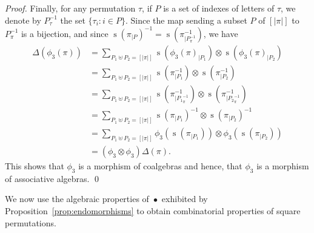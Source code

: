 \documentclass[a4paper,10pt]{llncs}
\DeclareMathOperator{\STD}{\mathrm{s}}
\DeclareMathOperator{\SHUFFLE}{\bullet}
\begin{document}
\begin{proof}
    Finally, for any permutation $\tau$, if $P$ is a set of indexes of
    letters of $\tau$, we denote by $P_\tau^{-1}$ the set
    $\{\tau_i : i \in P\}$. Since the map sending a subset $P$ of
    $[|\pi|]$ to $P_\pi^{-1}$ is a bijection, and since
    $\STD\left(\pi_{|P}\right)^{-1} = \STD\left(\pi^{-1}_{|P_\pi^{-1}}\right)$,
    we have
    \begin{equation} \begin{split}
        \Delta(\phi_3(\pi))
        & = \sum_{P_1 \uplus P_2 = [|\pi|]}
        \STD\left(\phi_3(\pi)_{|P_1}\right)
        \otimes \STD\left(\phi_3(\pi)_{|P_2}\right) \\
        & = \sum_{P_1 \uplus P_2 = [|\pi|]}
        \STD\left(\pi^{-1}_{|P_1}\right)
        \otimes \STD\left(\pi^{-1}_{|P_2}\right) \\
        & = \sum_{P_1 \uplus P_2 = [|\pi|]}
        \STD\left(\pi^{-1}_{|{P_1}_\pi^{-1}}\right)
        \otimes \STD\left(\pi^{-1}_{|{P_2}_\pi^{-1}}\right) \\
        & = \sum_{P_1 \uplus P_2 = [|\pi|]}
        \STD\left(\pi_{|P_1}\right)^{-1}
        \otimes \STD\left(\pi_{|P_2}\right)^{-1} \\
        & = \sum_{P_1 \uplus P_2 = [|\pi|]}
        \phi_3\left(\STD\left(\pi_{|P_1}\right)\right)
        \otimes \phi_3\left(\STD\left(\pi_{|P_2}\right)\right) \\
        & = (\phi_3 \otimes \phi_3) \Delta(\pi).
    \end{split} \end{equation}
    This shows that $\phi_3$ is a morphism of coalgebras and hence, that
    $\phi_3$ is a morphism of associative algebras.
    \qed
\end{proof}
\medskip

We now use the algebraic properties of $\SHUFFLE$ exhibited by
Proposition~\ref{prop:endomorphisms} to obtain combinatorial properties
of square permutations.
\medskip
\end{document}
